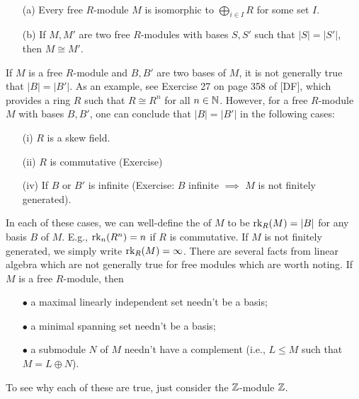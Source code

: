 \documentclass[11pt]{book}
\theoremstyle{definition}   \newtheorem{defn}[counter]{Definition} %
\newcommand{\vs}{\vspace{8pt}}   \newcommand{\hs}{\hspace{8pt}}
\numberwithin{counter}{chapter}
\begin{document}
\vs

\begin{corollary}\
\begin{enumerate}
\item[(a)] Every free $R$-module $M$ is isomorphic to $\bigoplus_{i \in I} R$ for some set $I$.
\item[(b)] If $M,M'$ are two free $R$-modules with bases $S,S'$ such that $|S| = |S'|$, then $M \cong M'$.
\end{enumerate}
\end{corollary}

\vs

\begin{remark}
If $M$ is a free $R$-module and $B,B'$ are two bases of $M$, it is not generally true that $|B| = |B'|$. As an example, see Exercise 27 on page 358 of [DF], which provides a ring $R$ such that $R \cong R^n$ for all $n \in \operatorname{\mathbb{N}}$. However, for a free $R$-module $M$ with bases $B,B'$, one can conclude that $|B| = |B'|$ in the following cases:
\begin{enumerate}
\item[(i)] $R$ is a skew field.
\item[(ii)] $R$ is commutative (Exercise)
\item[(iv)] If $B$ or $B'$ is infinite (Exercise: $B$ infinite $\implies$ $M$ is not finitely generated).
\end{enumerate}

In each of these cases, we can well-define the  of $M$ to be $\textnormal{rk}_R(M) = |B|$ for any basis $B$ of $M$. E.g., $\textnormal{rk}_n(R^n) = n$ if $R$ is commutative. If $M$ is not finitely generated, we simply write $\textnormal{rk}_R(M) = \infty$. There are several facts from linear algebra which are not generally true for free modules which are worth noting. If $M$ is a free $R$-module, then
\begin{enumerate}
\item[$\bullet$] a maximal linearly independent set needn't be a basis;
\item[$\bullet$] a minimal spanning set needn't be a basis;
\item[$\bullet$] a submodule $N$ of $M$ needn't have a complement (i.e., $L \leq M$ such that $M = L \oplus N$).
\end{enumerate}

To see why each of these are true, just consider the $\operatorname{\mathbb{Z}}$-module $\operatorname{\mathbb{Z}}$.
\end{remark}

\vs
\end{document}
